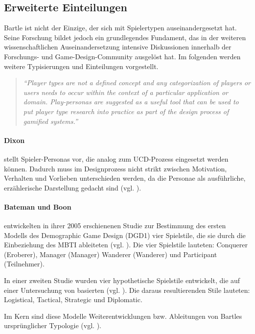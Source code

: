 \subsection{Erweiterte Einteilungen}
Bartle ist nicht der Einzige, der sich mit Spielertypen auseinandergesetzt hat. Seine Forschung bildet jedoch ein grundlegendes Fundament, das in der weiteren wissenschaftlichen Auseinandersetzung intensive Diskussionen innerhalb der Forschungs- und Game-Design-Community ausgelöst hat. Im folgenden werden weitere Typisierungen und Einteilungen vorgestellt.
\begin{quote}
    \textit{
        \enquote{Player types are not a defined concept and any categorization of players or users needs to occur within the context of a particular application or domain. Play-personas are suggested as a useful tool that can be used to put player type research into practice as part of the design process of gamified systems.}
    } 
    \cite{dixon_player_2011}
\end{quote}

\paragraph{Dixon} 
stellt Spieler-Personas vor, die analog zum \ac{UCD}-Prozess eingesetzt werden können. Dadurch muss im Designprozess nicht strikt zwischen Motivation, Verhalten und Vorlieben unterschieden werden, da die Personae als ausführliche, erzählerische Darstellung gedacht sind (vgl. \citealp{dixon_player_2011}).

\paragraph{Bateman und Boon}
entwickelten in ihrer 2005 erschienenen Studie zur Bestimmung des ersten Modells des Demographic Game Design (DGD1) vier Spielstile, die sie durch die Einbeziehung des \ac{MBTI} ableiteten (vgl. \citealp{the_myers-briggs_company_mbti_nodate, bateman_21st_2005}).
Die vier Spielstile lauteten: Conquerer (Eroberer), Manager (Manager) Wanderer (Wanderer) und Participant (Teilnehmer).

In einer zweiten Studie wurden vier hypothetische Spielstile entwickelt, die auf einer Untersuchung von \cite{berens_understanding_2000} basierten (vgl. \citealp{bateman_player_2012}). Die daraus resultierenden Stile lauteten: Logistical, Tactical, Strategic und Diplomatic.

Im Kern sind diese Modelle Weiterentwicklungen bzw. Ableitungen von Bartles ursprünglicher Typologie (vgl. \citealp{institut_fur_ludologie_spielertypen_nodate}).

